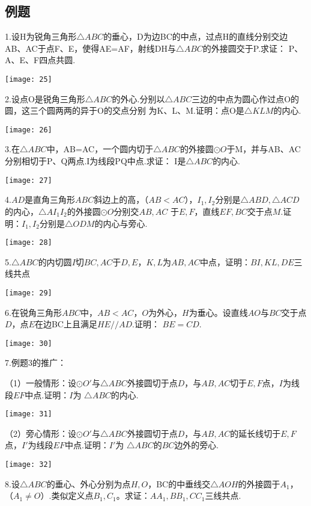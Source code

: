 \subsection{例题}
1.设H为锐角三角形$\bigtriangleup ABC$的垂心，D为边BC的中点，过点H的直线分别交边AB、AC于点F、E，使得AE=AF，射线DH与$\bigtriangleup ABC$的外接圆交于P.求证：
P、A、E、F四点共圆.

\begin{center}
    \texttt{[image: 25]}
\end{center}

2.设点O是锐角三角形$\bigtriangleup ABC$的外心.分别以$\bigtriangleup ABC$三边的中点为圆心作过点O的圆，这三个圆两两的异于O的交点分别
为K、L、M.证明：点O是$\bigtriangleup KLM$的内心.
\begin{center}
    \texttt{[image: 26]}
\end{center}
\newpage
3.在$\bigtriangleup ABC$中，AB=AC，一个圆内切于$\bigtriangleup ABC$的外接圆$\odot O$于M，并与AB、AC分别相切于P、Q两点.I为线段PQ中点.求证：
I是$\bigtriangleup ABC$的内心.
\begin{center}
    \texttt{[image: 27]}
\end{center}

4.$AD$是直角三角形$ABC$斜边上的高，（$AB<AC$），$I_1,I_2$分别是$\bigtriangleup ABD,\bigtriangleup ACD$的内心，$\bigtriangleup AI_1I_2$的外接圆$\odot O$分别交$AB,AC$
于$E,F$，直线$EF,BC$交于点$M$.证明：$I_1,I_2$分别是$\bigtriangleup ODM$的内心与旁心.
\begin{center}
    \texttt{[image: 28]}
\end{center}

5.$\bigtriangleup ABC$的内切圆$I$切$BC,AC$于$D,E$，$K,L$为$AB,AC$中点，证明：$BI,KL,DE$三线共点
\begin{center}
    \texttt{[image: 29]}
\end{center}
\newpage

6.在锐角三角形$ABC$中，$AB<AC$，$O$为外心，$H$为垂心。设直线$AO$与$BC$交于点$D$，点$E$在边BC上且满足$HE // AD$.证明：
$BE=CD$.
\begin{center}
    \texttt{[image: 30]}
\end{center}

7.例题3的推广：

（1）一般情形：设$\odot O'$与$\bigtriangleup ABC$外接圆切于点$D$，与$AB,AC$切于$E,F$点，$I$为线段$EF$中点.证明：$I$为
$\bigtriangleup ABC$的内心.
\begin{center}
    \texttt{[image: 31]}
\end{center}

（2）旁心情形：设$\odot O'$与$\bigtriangleup ABC$外接圆切于点$D$，与$AB,AC$的延长线切于$E,F$点，$I'$为线段$EF$中点.证明：$I'$为
$\bigtriangleup ABC$的$BC$边外的旁心.
\begin{center}
    \texttt{[image: 32]}
\end{center}

8.设$\bigtriangleup ABC$的垂心、外心分别为点$H,O$，BC的中垂线交$\bigtriangleup AOH$的外接圆于$A_1$，
（$A_1\neq O$）.类似定义点$B_1,C_1$。求证：$AA_1,BB_1,CC_1$三线共点.